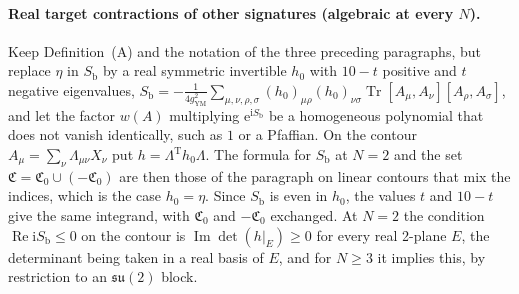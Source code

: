 \paragraph{Real target contractions of other signatures (algebraic at every \(N\)).}
Keep Definition~(A) and the notation of the three preceding paragraphs, but replace \(\eta\) in \(S_{\mathrm b}\) by a real symmetric invertible \(h_0\) with \(10-t\) positive and \(t\) negative eigenvalues, \(S_{\mathrm b}=-\tfrac1{4g_{\mathrm{YM}}^2}\sum_{\mu,\nu,\rho,\sigma}(h_0)_{\mu\rho}(h_0)_{\nu\sigma}\operatorname{Tr}[A_\mu,A_\nu][A_\rho,A_\sigma]\), and let the factor \(w(A)\) multiplying \(\mathrm e^{\mathrm iS_{\mathrm b}}\) be a homogeneous polynomial that does not vanish identically, such as \(1\) or a Pfaffian. On the contour \(A_\mu=\sum_\nu\Lambda_{\mu\nu}X_\nu\) put \(h=\Lambda^{\mathrm T}h_0\Lambda\). The formula for \(S_{\mathrm b}\) at \(N=2\) and the set \(\mathfrak C=\mathfrak C_0\cup(-\mathfrak C_0)\) are then those of the paragraph on linear contours that mix the indices, which is the case \(h_0=\eta\). Since \(S_{\mathrm b}\) is even in \(h_0\), the values \(t\) and \(10-t\) give the same integrand, with \(\mathfrak C_0\) and \(-\mathfrak C_0\) exchanged. At \(N=2\) the condition \(\operatorname{Re}\mathrm iS_{\mathrm b}\le0\) on the contour is \(\operatorname{Im}\det(h|_E)\ge0\) for every real 2-plane \(E\), the determinant being taken in a real basis of \(E\), and for \(N\ge3\) it implies this, by restriction to an \(\mathfrak{su}(2)\) block.

